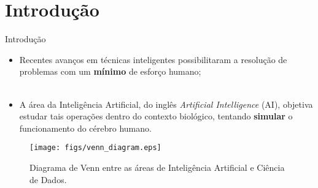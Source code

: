 \section{Introdução}
\label{s.introduction}


\begin{frame}{Introdução}
	\begin{itemize}
		\justifying
		\item Recentes avanços em técnicas inteligentes possibilitaram a resolução de problemas com um \textbf{mínimo} de esforço humano;
		\\~\\
		\item A área da Inteligência Artificial, do inglês \emph{Artificial Intelligence} (AI), objetiva estudar tais operações dentro do contexto biológico, tentando \textbf{simular} o funcionamento do cérebro humano.
	\end{itemize}
\end{frame}

\begin{frame}
	\begin{figure}[!ht]
		\centering
		\texttt{[image: figs/venn\_diagram.eps]}	
		\label{f.venn_diagram}
		\caption{Diagrama de Venn entre as áreas de Inteligência Artificial e Ciência de Dados.}
	\end{figure}
\end{frame}